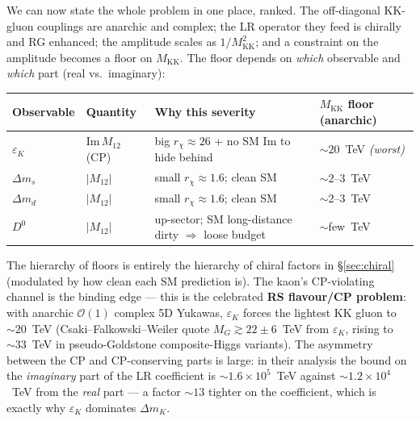 \documentclass[11pt]{article}
\newcommand{\MKK}{M_{\mathrm{KK}}}
\newcommand{\eps}{\varepsilon}
\newcommand{\Mtwelve}{M_{12}}
\newcommand{\ImMtwelve}{\mathrm{Im}\,M_{12}}
\theoremstyle{definition}
\begin{document}
We can now state the whole problem in one place, ranked. The off-diagonal
KK-gluon couplings are anarchic and complex; the LR operator they feed is
chirally and RG enhanced; the amplitude scales as $1/\MKK^2$; and a constraint on
the amplitude becomes a floor on $\MKK$. The floor depends on \emph{which}
observable and \emph{which} part (real vs.\ imaginary):
\begin{center}
\begin{tabular}{llll}
\toprule
Observable & Quantity & Why this severity & $\MKK$ floor (anarchic) \\
\midrule
$\eps_K$ & $\ImMtwelve$ (CP) & big $r_\chi\approx26$ + no SM Im to hide behind & $\sim 20$~TeV \emph{(worst)} \\
$\Delta m_s$ & $|\Mtwelve|$ & small $r_\chi\approx1.6$; clean SM & $\sim 2$--$3$~TeV \\
$\Delta m_d$ & $|\Mtwelve|$ & small $r_\chi\approx1.6$; clean SM & $\sim 2$--$3$~TeV \\
$D^0$ & $|\Mtwelve|$ & up-sector; SM long-distance dirty $\Rightarrow$ loose budget & $\sim$few~TeV \\
\bottomrule
\end{tabular}
\end{center}
The hierarchy of floors is entirely the hierarchy of chiral factors in
\S\ref{sec:chiral} (modulated by how clean each SM prediction is). The kaon's
CP-violating channel is the binding edge --- this is the celebrated
\textbf{RS flavour/CP problem}: with anarchic $\mathcal{O}(1)$ complex 5D Yukawas,
$\eps_K$ forces the lightest KK gluon to $\sim20$~TeV
(Csaki--Falkowski--Weiler quote $M_G\gtrsim22\pm6$~TeV from $\eps_K$, rising to
$\sim33$~TeV in pseudo-Goldstone composite-Higgs variants). The asymmetry between
the CP and CP-conserving parts is large: in their analysis the bound on the
\emph{imaginary} part of the LR coefficient is $\sim1.6\times10^5$~TeV against
$\sim1.2\times10^4$~TeV from the \emph{real} part --- a factor $\sim13$ tighter on
the coefficient, which is exactly why $\eps_K$ dominates $\Delta m_K$.
\end{document}
